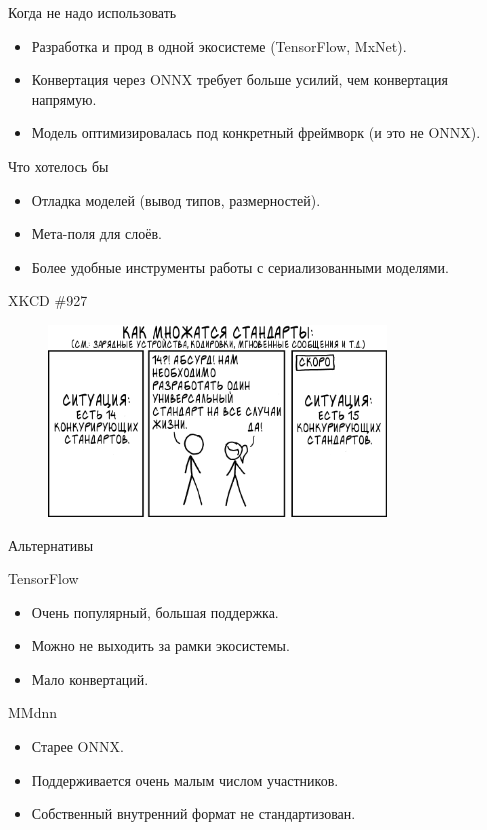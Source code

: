 \documentclass[mathserif,serif,unicode]{beamer}
\begin{document}
\begin{frame}{Когда не надо использовать}

\begin{itemize}
    \item Разработка и прод в одной экосистеме (TensorFlow, MxNet).
    \item Конвертация через ONNX требует больше усилий, чем конвертация напрямую.
    \item Модель оптимизировалась под конкретный фреймворк (и это не ONNX).
\end{itemize}
    
\end{frame}

\begin{frame}{Что хотелось бы}

\begin{itemize}
    \item Отладка моделей (вывод типов, размерностей).
    \item Мета-поля для слоёв.
    \item Более удобные инструменты работы с сериализованными моделями.
\end{itemize}
    
\end{frame}

\begin{frame}{XKCD \#927}
    \begin{figure}
        \centering
        \includegraphics[width=0.8\textwidth]{images/927_v4.png}
    \end{figure}
\end{frame}

\begin{frame}{Альтернативы}

    TensorFlow
    \begin{itemize}
        \item Очень популярный, большая поддержка.
        \item Можно не выходить за рамки экосистемы.
        \item Мало конвертаций.
    \end{itemize}
\vspace{5mm}
    MMdnn
    \begin{itemize}
        \item Старее ONNX.
        \item Поддерживается очень малым числом участников.
        \item Собственный внутренний формат не стандартизован.
    \end{itemize}
\end{frame}
\end{document}
